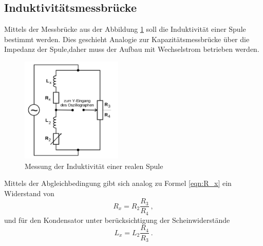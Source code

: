 \subsection{Induktivitätsmessbrücke}
Mittels der Messbrücke aus der Abbildung \ref{fig:L} soll die Induktivität einer Spule bestimmt werden. Dies geschieht Analogie zur Kapazitätsmessbrücke über die Impedanz der Spule,daher muss der Aufbau mit Wechselstrom betrieben werden.

\begin{figure}
  \centering
  \includegraphics[height=5cm]{picture/4.png}
  \caption{Messung der Induktivität einer realen Spule}
  \label{fig:L}
\end{figure}
Mittels der Abgleichbedingung gibt sich analog zu Formel \ref{eqn:R_x} ein Widerstand von
\begin{equation*}
     R_x = R_2 \frac{R_3}{R_4} \ ,
\end{equation*}
und für den Kondensator unter berücksichtigung der Scheinwiderstände
\begin{equation}
   L_x = L_2 \frac{R_4}{R_3} \ .
   \label{C_x}
\end{equation}
